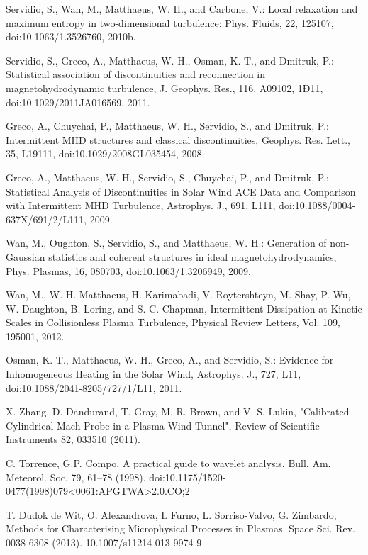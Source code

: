 \documentclass[12pt]{iopart}
\begin{document}
\begin{thebibliography}{10}
Servidio, S., Wan, M., Matthaeus, W. H., and Carbone, V.: Local relaxation and maximum entropy in two-dimensional turbulence: Phys. Fluids, 22, 125107, doi:10.1063/1.3526760, 2010b.

Servidio, S., Greco, A., Matthaeus, W. H., Osman, K. T., and Dmitruk, P.: Statistical association of discontinuities and reconnection in magnetohydrodynamic turbulence, J. Geophys. Res., 116, A09102, 1Ð11, doi:10.1029/2011JA016569, 2011.

Greco, A., Chuychai, P., Matthaeus, W. H., Servidio, S., and Dmitruk, P.: Intermittent MHD structures and classical discontinuities, Geophys. Res. Lett., 35, L19111, doi:10.1029/2008GL035454, 2008.

Greco, A., Matthaeus, W. H., Servidio, S., Chuychai, P., and Dmitruk, P.: Statistical Analysis of Discontinuities in Solar Wind ACE Data and Comparison with Intermittent MHD Turbulence, Astrophys. J., 691, L111, doi:10.1088/0004-637X/691/2/L111, 2009.

Wan, M., Oughton, S., Servidio, S., and Matthaeus, W. H.: Generation of non-Gaussian statistics and coherent structures in ideal magnetohydrodynamics, Phys. Plasmas, 16, 080703, doi:10.1063/1.3206949, 2009.

Wan, M., W. H. Matthaeus, H. Karimabadi, V. Roytershteyn, M. Shay, P. Wu, W. Daughton, B. Loring, and S. C. Chapman, Intermittent Dissipation at Kinetic Scales in Collisionless Plasma Turbulence, Physical Review Letters, Vol. 109, 195001, 2012. 

Osman, K. T., Matthaeus, W. H., Greco, A., and Servidio, S.: Evidence for Inhomogeneous Heating in the Solar Wind, Astrophys. J., 727, L11, doi:10.1088/2041-8205/727/1/L11, 2011.

X. Zhang, D. Dandurand, T. Gray, M. R. Brown, and V. S. Lukin, "Calibrated Cylindrical Mach Probe in a Plasma Wind Tunnel", Review of Scientific Instruments 82, 033510 (2011).

C. Torrence, G.P. Compo, A practical guide to wavelet analysis. Bull. Am. Meteorol. Soc. 79, 61–78 (1998). doi:10.1175/1520-0477(1998)079<0061:APGTWA>2.0.CO;2

T. Dudok de Wit, O. Alexandrova, I. Furno, L. Sorriso-Valvo, G. Zimbardo, Methods for Characterising Microphysical Processes in Plasmas. Space Sci. Rev. 0038-6308 (2013). 10.1007/s11214-013-9974-9


\end{thebibliography}
\end{document}
